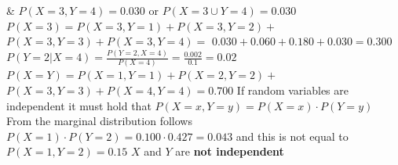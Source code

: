 {\begin{twoColTable}
				& $P(X=3, Y=4)=0.030$ or $P(X=3 \cup Y=4)=0.030$\vfill
				\vspace*{0.3cm}
				  $P(X=3) = P(X=3, Y=1)+P(X=3, Y=2)+$ \vfill $P(X=3, Y=3)+P(X=3, Y=4) = $\vfill
				  $0.030+0.060+0.180+0.030=0.300$\vfill
				\vspace*{0.3cm}
				$P(Y=2|X=4)=\frac{P(Y=2,X=4)}{P(X=4)}=\frac{0.002}{0.1}=0.02$					\vfill
				\vspace*{0.3cm} 
				$P(X=Y)= P(X=1, Y=1)+P(X=2, Y=2)+$ \vfill $P(X=3, Y=3)+P(X=4, Y=4) = 0.700$\vfill
				\vspace*{0.3cm}
				If random variables are independent it must hold that \vfill
				{$P(X=x, Y=y)=P(X=x) \cdot P(Y=y)$}\vfill
				From the marginal distribution follows \vfill				
				{$P(X=1) \cdot P(Y=2) = 0.100 \cdot 0.427 = 0.043$}			\vfill
				and this is not equal to\vfill
				{$P(X=1, Y=2)= 0.15$}\vfill
				$X$ and $Y$ are \textbf{not independent}\\ 
				\hline
\end{twoColTable}

}
